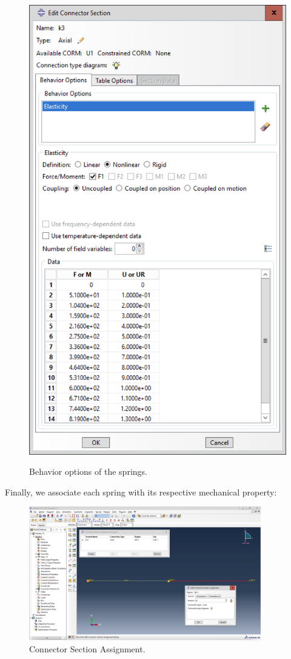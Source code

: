 \begin{figure}[H]
{        \includegraphics[scale=0.4]{Images/ab1/a9.png}
    }
    \caption{Behavior options of the springs.}
    \label{fig:a89}
\end{figure}

Finally, we associate each spring with its respective mechanical property:
\begin{figure}[H]
    \centering
    \includegraphics[width=0.9\textwidth]{Images/ab1/a10.png}
    \caption{Connector Section Assignment.}
    \label{fig:a10}
\end{figure}

